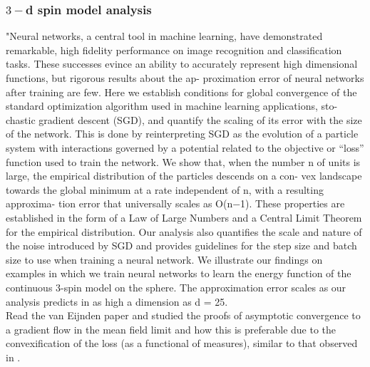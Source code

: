 \documentclass{article}
\begin{document}
\subsubsection{$ 3-$d spin model analysis}
"Neural networks, a central tool in machine learning, have demonstrated remarkable,
high fidelity performance on image recognition and classification tasks. These successes evince
an ability to accurately represent high dimensional functions, but rigorous results about the ap-
proximation error of neural networks after training are few. Here we establish conditions for global
convergence of the standard optimization algorithm used in machine learning applications, sto-
chastic gradient descent (SGD), and quantify the scaling of its error with the size of the network.
This is done by reinterpreting SGD as the evolution of a particle system with interactions governed
by a potential related to the objective or “loss” function used to train the network. We show that,
when the number n of units is large, the empirical distribution of the particles descends on a con-
vex landscape towards the global minimum at a rate independent of n, with a resulting approxima-
tion error that universally scales as O(n−1). These properties are established in the form of a Law
of Large Numbers and a Central Limit Theorem for the empirical distribution. Our analysis also
quantifies the scale and nature of the noise introduced by SGD and provides guidelines for the step
size and batch size to use when training a neural network. We illustrate our findings on examples in
which we train neural networks to learn the energy function of the continuous 3-spin model on the
sphere. The approximation error scales as our analysis predicts in as high a dimension as d = 25.\\

Read the van Eijnden paper and studied the proofs of asymptotic convergence to a gradient flow in the mean field limit and how this is preferable due to the convexification of the loss (as a functional of measures), similar to that observed in \cite{Mei_2018}.
\end{document}
